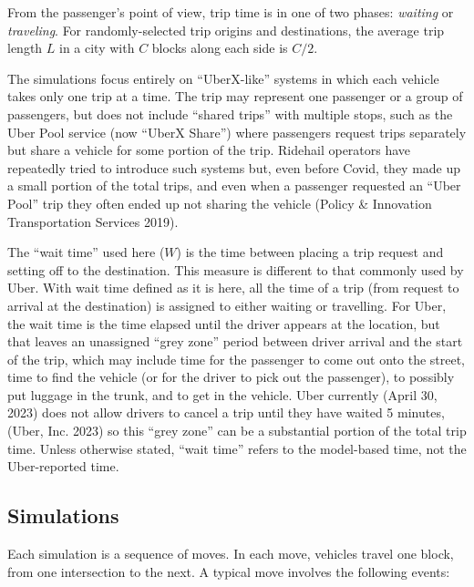 \documentclass[
  letterpaper,
  DIV=11,
  numbers=noendperiod]{scrartcl}
\begin{document}
From the passenger's point of view, trip time is in one of two phases:
\emph{waiting} or \emph{traveling}. For randomly-selected trip origins
and destinations, the average trip length \(L\) in a city with \(C\)
blocks along each side is \(C/2\).

The simulations focus entirely on ``UberX-like'' systems in which each
vehicle takes only one trip at a time. The trip may represent one
passenger or a group of passengers, but does not include ``shared
trips'' with multiple stops, such as the Uber Pool service (now ``UberX
Share'') where passengers request trips separately but share a vehicle
for some portion of the trip. Ridehail operators have repeatedly tried
to introduce such systems but, even before Covid, they made up a small
portion of the total trips, and even when a passenger requested an
``Uber Pool'' trip they often ended up not sharing the vehicle (Policy
\& Innovation Transportation Services 2019).

The ``wait time'' used here (\(W\)) is the time between placing a trip
request and setting off to the destination. This measure is different to
that commonly used by Uber. With wait time defined as it is here, all
the time of a trip (from request to arrival at the destination) is
assigned to either waiting or travelling. For Uber, the wait time is the
time elapsed until the driver appears at the location, but that leaves
an unassigned ``grey zone'' period between driver arrival and the start
of the trip, which may include time for the passenger to come out onto
the street, time to find the vehicle (or for the driver to pick out the
passenger), to possibly put luggage in the trunk, and to get in the
vehicle. Uber currently (April 30, 2023) does not allow drivers to
cancel a trip until they have waited 5 minutes,(Uber, Inc. 2023) so this
``grey zone'' can be a substantial portion of the total trip time.
Unless otherwise stated, ``wait time'' refers to the model-based time,
not the Uber-reported time.

\hypertarget{the-simulation}{%
\subsection{Simulations}\label{the-simulation}}

Each simulation is a sequence of moves. In each move, vehicles travel
one block, from one intersection to the next. A typical move involves
the following events:
\end{document}
